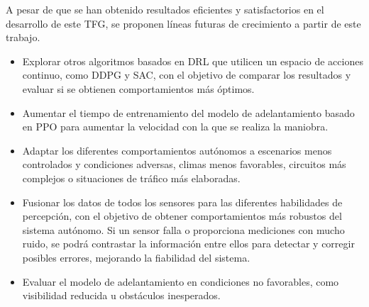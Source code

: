 A pesar de que se han obtenido resultados eficientes y satisfactorios en el desarrollo de este \ac{TFG}, se proponen líneas futuras de crecimiento a partir de este trabajo. 
\begin{itemize}
\item Explorar otros algoritmos basados en \ac{DRL} que utilicen un espacio de acciones continuo, como \ac{DDPG} y \ac{SAC}, con el objetivo de comparar los resultados y evaluar si se obtienen comportamientos más óptimos.
\item Aumentar el tiempo de entrenamiento del modelo de adelantamiento basado en \ac{PPO} para aumentar la velocidad con la que se realiza la maniobra.
\item Adaptar los diferentes comportamientos autónomos a escenarios menos controlados y condiciones adversas, climas menos favorables, circuitos más complejos o situaciones de tráfico más elaboradas.
\item Fusionar los datos de todos los sensores para las diferentes habilidades de percepción, con el objetivo de obtener comportamientos más robustos del sistema autónomo. Si un sensor falla o proporciona mediciones con mucho ruido, se podrá contrastar la información entre ellos para detectar y corregir posibles errores, mejorando la fiabilidad del sistema.
\item Evaluar el modelo de adelantamiento en condiciones no favorables, como visibilidad reducida u obstáculos inesperados.
\end{itemize}

